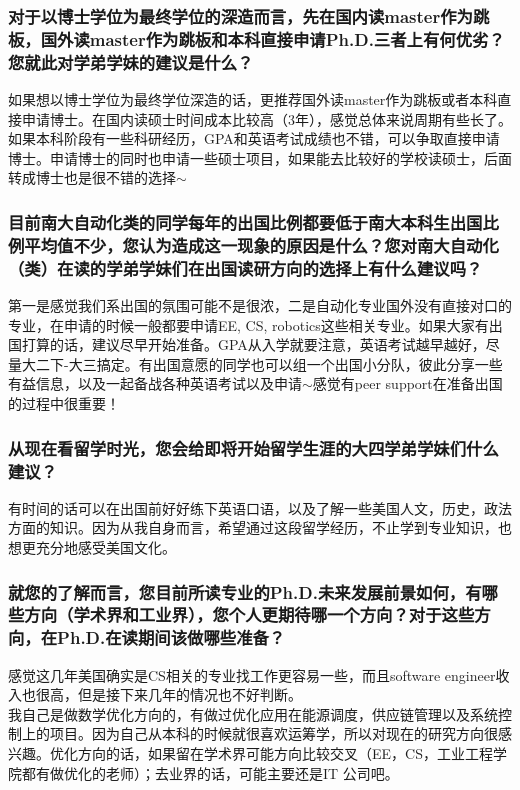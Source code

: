 \documentclass[a4paper,UTF8]{book}
\begin{document}
    \subsubsection*{对于以博士学位为最终学位的深造而言，先在国内读master作为跳板，国外读master作为跳板和本科直接申请Ph.D.三者上有何优劣？您就此对学弟学妹的建议是什么？}
    如果想以博士学位为最终学位深造的话，更推荐国外读master作为跳板或者本科直接申请博士。在国内读硕士时间成本比较高（3年），感觉总体来说周期有些长了。如果本科阶段有一些科研经历，GPA和英语考试成绩也不错，可以争取直接申请博士。申请博士的同时也申请一些硕士项目，如果能去比较好的学校读硕士，后面转成博士也是很不错的选择$\sim$

    \subsubsection*{目前南大自动化类的同学每年的出国比例都要低于南大本科生出国比例平均值不少，您认为造成这一现象的原因是什么？您对南大自动化（类）在读的学弟学妹们在出国读研方向的选择上有什么建议吗？}
    第一是感觉我们系出国的氛围可能不是很浓，二是自动化专业国外没有直接对口的专业，在申请的时候一般都要申请EE, CS, robotics这些相关专业。如果大家有出国打算的话，建议尽早开始准备。GPA从入学就要注意，英语考试越早越好，尽量大二下-大三搞定。有出国意愿的同学也可以组一个出国小分队，彼此分享一些有益信息，以及一起备战各种英语考试以及申请$\sim$感觉有peer support在准备出国的过程中很重要！

    \subsubsection*{从现在看留学时光，您会给即将开始留学生涯的大四学弟学妹们什么建议？}
    有时间的话可以在出国前好好练下英语口语，以及了解一些美国人文，历史，政法方面的知识。因为从我自身而言，希望通过这段留学经历，不止学到专业知识，也想更充分地感受美国文化。

    \subsubsection*{就您的了解而言，您目前所读专业的Ph.D.未来发展前景如何，有哪些方向（学术界和工业界），您个人更期待哪一个方向？对于这些方向，在Ph.D.在读期间该做哪些准备？}
    感觉这几年美国确实是CS相关的专业找工作更容易一些，而且software engineer收入也很高，但是接下来几年的情况也不好判断。\\
    我自己是做数学优化方向的，有做过优化应用在能源调度，供应链管理以及系统控制上的项目。因为自己从本科的时候就很喜欢运筹学，所以对现在的研究方向很感兴趣。优化方向的话，如果留在学术界可能方向比较交叉（EE，CS，工业工程学院都有做优化的老师）；去业界的话，可能主要还是IT 公司吧。
\end{document}
